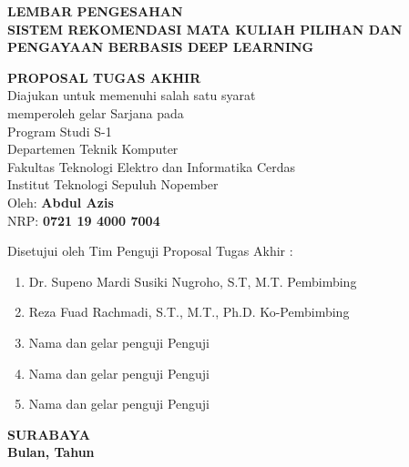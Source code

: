 {
\begin{center}
    \uppercase{\textbf{\large Lembar Pengesahan}} \\

    \vspace*{15mm}
    \uppercase{\textbf{Sistem rekomendasi Mata Kuliah Pilihan dan Pengayaan berbasis Deep Learning}}
    \vspace*{15mm}

    \uppercase{\textbf{Proposal Tugas Akhir}} \\
    Diajukan untuk memenuhi salah satu syarat          \\
    memperoleh gelar Sarjana pada                      \\
    Program Studi S-1                                  \\
    Departemen Teknik Komputer                         \\
    Fakultas Teknologi Elektro dan Informatika Cerdas  \\
    Institut Teknologi Sepuluh Nopember                \\

    \vspace*{1.5cm}
    Oleh: \textbf{Abdul Azis}                          \\
    NRP: \textbf{0721 19 4000 7004}                    \\
    \vspace*{1.5cm}

    Disetujui oleh Tim Penguji Proposal Tugas Akhir :  \\
    \vspace*{5mm}

    \begin{enumerate}
        \setlength\itemsep{1.5em}
        \item Dr. Supeno Mardi Susiki Nugroho, S.T, M.T. \hfill Pembimbing
        \item Reza Fuad Rachmadi, S.T., M.T., Ph.D. \hfill Ko-Pembimbing
        \item Nama dan gelar penguji \hfill Penguji
        \item Nama dan gelar penguji \hfill Penguji
        \item Nama dan gelar penguji \hfill Penguji
    \end{enumerate}

    \vspace*{1.5cm}
    \uppercase{\textbf{surabaya}}                      \\
    \textbf{Bulan, Tahun}                              \\

\end{center}
}
